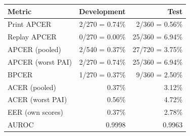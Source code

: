 \begin{tabular}{lrr}
\toprule
Metric & Development & Test \\
\midrule
Print APCER & 2/270 = 0.74\% & 2/360 = 0.56\% \\
Replay APCER & 0/270 = 0.00\% & 25/360 = 6.94\% \\
APCER (pooled) & 2/540 = 0.37\% & 27/720 = 3.75\% \\
APCER (worst PAI) & 2/270 = 0.74\% & 25/360 = 6.94\% \\
BPCER & 1/270 = 0.37\% & 9/360 = 2.50\% \\
ACER (pooled) & 0.37\% & 3.12\% \\
ACER (worst PAI) & 0.56\% & 4.72\% \\
EER (own scores) & 0.37\% & 2.78\% \\
AUROC & 0.9998 & 0.9963 \\
\bottomrule
\end{tabular}
